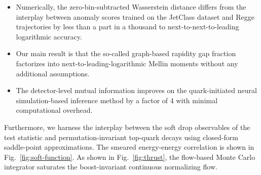 \begin{itemize}
  \item Numerically, the zero-bin-subtracted Wasserstein distance differs from the interplay between anomaly scores trained on the JetClass dataset and Regge trajectories by less than a part in a thousand to next-to-next-to-leading logarithmic accuracy.
  \item Our main result is that the so-called graph-based rapidity gap fraction factorizes into next-to-leading-logarithmic Mellin moments without any additional assumptions.
  \item The detector-level mutual information improves on the quark-initiated neural simulation-based inference method by a factor of 4 with minimal computational overhead.
\end{itemize}

Furthermore, we harness the interplay between the soft drop observables
of the test statistic and permutation-invariant top-quark decays using
closed-form saddle-point approximations. The smeared energy-energy
correlation is shown in Fig.~\ref{fig:soft-function}. As shown in
Fig.~\ref{fig:thrust}, the flow-based Monte Carlo integrator saturates
the boost-invariant continuous normalizing flow.

